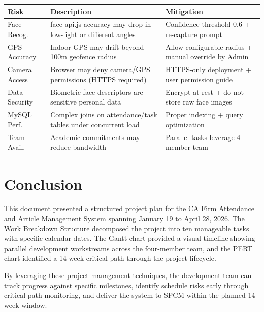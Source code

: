 \documentclass[12pt,a4paper]{article}
\begin{document}
\begin{center}
\begin{tabularx}{\textwidth}{l X l}
\toprule
\textbf{Risk} & \textbf{Description} & \textbf{Mitigation} \\
\midrule
Face Recog. & face-api.js accuracy may drop in low-light or different angles & Confidence threshold 0.6 + re-capture prompt \\[4pt]
GPS Accuracy & Indoor GPS may drift beyond 100m geofence radius & Allow configurable radius + manual override by Admin \\[4pt]
Camera Access & Browser may deny camera/GPS permissions (HTTPS required) & HTTPS-only deployment + user permission guide \\[4pt]
Data Security & Biometric face descriptors are sensitive personal data & Encrypt at rest + do not store raw face images \\[4pt]
MySQL Perf. & Complex joins on attendance/task tables under concurrent load & Proper indexing + query optimization \\[4pt]
Team Avail. & Academic commitments may reduce bandwidth & Parallel tasks leverage 4-member team \\
\bottomrule
\end{tabularx}
\end{center}

\section{Conclusion}
This document presented a structured project plan for the CA Firm Attendance and Article Management System spanning January 19 to April 28, 2026. The Work Breakdown Structure decomposed the project into ten manageable tasks with specific calendar dates. The Gantt chart provided a visual timeline showing parallel development workstreams across the four-member team, and the PERT chart identified a 14-week critical path through the project lifecycle.

By leveraging these project management techniques, the development team can track progress against specific milestones, identify schedule risks early through critical path monitoring, and deliver the system to SPCM within the planned 14-week window.
\end{document}
